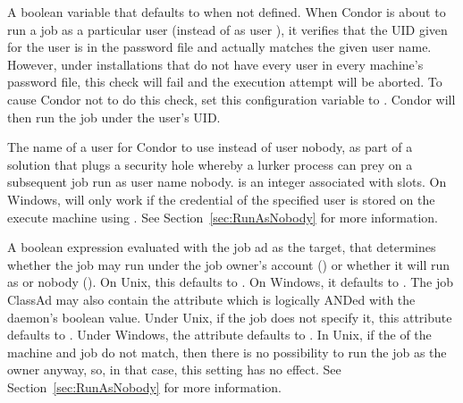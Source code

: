 \begin{description}
\label{param:SoftUidDomain}
\item[\Macro{SOFT\_UID\_DOMAIN}]
  A boolean variable that defaults to  when not defined.
  When Condor is about to run a job as a particular user 
  (instead of as user ),
  it verifies that the UID given for the user is in the
  password file and actually matches the given user name.
  However, under installations that do not have every user
  in every machine's password file,
  this check will fail and the execution attempt will be aborted.
  To cause Condor not to do
  this check, set this configuration variable to .
  Condor will then run the job under the user's UID.

\label{param:SlotNUser}
\item[\Macro{SLOT<N>\_USER}]
  The name of a user for Condor to use instead of
  user nobody,
  as part of a solution that plugs a security hole whereby
  a lurker process can prey on a subsequent job run as user name nobody. 
   is an integer associated with slots.
  On Windows, 
  will only work if the credential of the specified
  user is stored on the execute machine using .
  See Section~\ref{sec:RunAsNobody} for more information.

\label{param:StarterAllowRunAsOwner}
\item[\Macro{STARTER\_ALLOW\_RUNAS\_OWNER}]
  A boolean expression evaluated with the job ad as the
  target, that determines whether the job may run under the job owner's
  account () or whether it will run as  or
  nobody ().  On Unix, this defaults to .
  On Windows, it defaults to .
  The job ClassAd may also contain the attribute
   which is logically ANDed with the  daemon's
  boolean value.  Under Unix, if the job does not specify it, this
  attribute defaults to .
  Under Windows, the attribute defaults to .
  In Unix, if the  of the machine and job do not
  match, then there is no possibility to run the job as the owner
  anyway, so, in that case, this setting has no effect.  See
  Section~\ref{sec:RunAsNobody} for more information.


\end{description}
